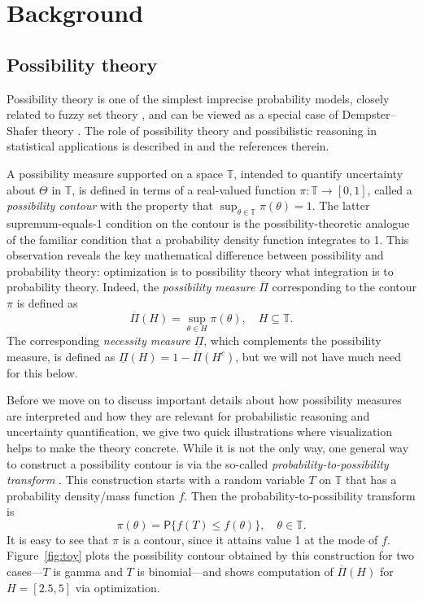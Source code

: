 \documentclass[12pt]{article}
\def\TT{\mathbb{T}}
\def\prob{\mathsf{P}}
\def\lPi{\underline{\Pi}}
\def\uPi{\overline{\Pi}}
\begin{document}
\section{Background} 
\label{sec:background}

\subsection{Possibility theory}
\label{SS:possibility}

Possibility theory \citep[e.g.,][]{dubois.prade.book} is one of the simplest imprecise probability models, closely related to fuzzy set theory \citep[e.g.,][]{klir1999fuzzy, zadeh1978fuzzy}, and can be viewed as a special case of Dempster--Shafer theory \citep[e.g.,][]{dempster2008, shafer1976, yagerliu2008}.  The role of possibility theory and possibilistic reasoning in statistical applications is described in \citet{dubois2006} and the references therein.  

A possibility measure supported on a space $\TT$, intended to quantify uncertainty about $\Theta$ in $\TT$, is defined in terms of a real-valued function $\pi: \TT \to [0,1]$, called a {\em possibility contour} with the property that $\sup_{\theta \in \TT} \pi(\theta)=1$.  The latter supremum-equals-1 condition on the contour is the possibility-theoretic analogue of the familiar condition that a probability density function integrates to 1.  This observation reveals the key mathematical difference between possibility and probability theory: optimization is to possibility theory what integration is to probability theory.  Indeed, the {\em possibility measure} $\uPi$ corresponding to the contour $\pi$ is defined as 
\begin{equation}
\label{eq:contour.to.poss}
\uPi(H) = \sup_{\theta \in H} \pi(\theta), \quad H \subseteq \TT. 
\end{equation}
The corresponding {\em necessity measure} $\lPi$, which complements the possibility measure, is defined as $\lPi(H) = 1 - \uPi(H^c)$, but we will not have much need for this below.  

Before we move on to discuss important details about how possibility measures are interpreted and how they are relevant for probabilistic reasoning and uncertainty quantification, we give two quick illustrations where visualization helps to make the theory concrete.  While it is not the only way, one general way to construct a possibility contour is via the so-called {\em probability-to-possibility transform} \citep[e.g.,][]{dubois.etal.2004, hose2020data, hose2021universal}.  This construction starts with a random variable $T$ on $\TT$ that has a probability density/mass function $f$.  Then the probability-to-possibility transform is 
\[ \pi(\theta) = \prob\{ f(T) \leq f(\theta) \}, \quad \theta \in \TT. \]
It is easy to see that $\pi$ is a contour, since it attains value 1 at the mode of $f$.  Figure~\ref{fig:toy} plots the possibility contour obtained by this construction for two cases---$T$ is gamma and $T$ is binomial---and shows computation of $\uPi(H)$ for $H=[2.5,5]$ via optimization.   
\end{document}
